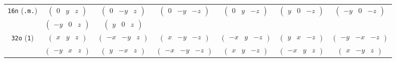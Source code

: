 \documentclass[fleqn,9pt,landscape]{jsarticle}
\begin{document}
\begin{center}
\begin{longtable}{ccccccc}
{\tt 16n} ({\tt .m.}) & $ \begin{pmatrix} 0 & y & z \end{pmatrix} $ & $ \begin{pmatrix} 0 & - y & z \end{pmatrix} $ & $ \begin{pmatrix} 0 & - y & - z \end{pmatrix} $ & $ \begin{pmatrix} 0 & y & - z \end{pmatrix} $ & $ \begin{pmatrix} y & 0 & - z \end{pmatrix} $ & $ \begin{pmatrix} - y & 0 & - z \end{pmatrix} $ \\
& $ \begin{pmatrix} - y & 0 & z \end{pmatrix} $ & $ \begin{pmatrix} y & 0 & z \end{pmatrix} $ & $  $ & $  $ & $  $ & $  $ \\ \hline
{\tt 32o} ({\tt 1}) & $ \begin{pmatrix} x & y & z \end{pmatrix} $ & $ \begin{pmatrix} - x & - y & z \end{pmatrix} $ & $ \begin{pmatrix} x & - y & - z \end{pmatrix} $ & $ \begin{pmatrix} - x & y & - z \end{pmatrix} $ & $ \begin{pmatrix} y & x & - z \end{pmatrix} $ & $ \begin{pmatrix} - y & - x & - z \end{pmatrix} $ \\
& $ \begin{pmatrix} - y & x & z \end{pmatrix} $ & $ \begin{pmatrix} y & - x & z \end{pmatrix} $ & $ \begin{pmatrix} - x & - y & - z \end{pmatrix} $ & $ \begin{pmatrix} x & y & - z \end{pmatrix} $ & $ \begin{pmatrix} - x & y & z \end{pmatrix} $ & $ \begin{pmatrix} x & - y & z \end{pmatrix} $ \\

\end{longtable}
\end{center}
\end{document}
